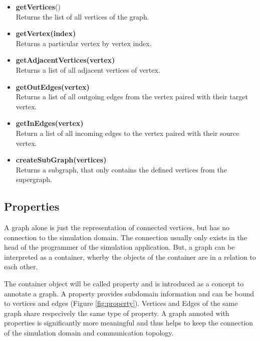 \begin{itemize}
  \item \textbf{getVertices}()\\
    Returns the list of all vertices of the graph.
    
  \item  \textbf{getVertex(index)}\\
    Returns a particular vertex by vertex index.

  \item  \textbf{getAdjacentVertices(vertex)}\\
    Returns a list of all adjacent vertices of vertex.

  \item  \textbf{getOutEdges(vertex)}\\
    Returns a list of all outgoing edges from the vertex
    paired with their target vertex.

  \item  \textbf{getInEdges(vertex)}\\
    Return a list of all incoming edges to the vertex 
    paired with their source vertex.

  \item  \textbf{createSubGraph(vertices)}\\
    Returns a subgraph, that only contains the defined
    vertices from the supergraph.
\end{itemize}

\subsection{Properties}
A graph alone is just the representation of connected vertices, but
has no connection to the simulation domain. The connection usually
only exists in the head of the programmer of the simulation
application. But, a graph can be interpreted as a container, wherby the
objects of the container are in a relation to each other.

The container object will be called property and is introduced as a
concept to annotate a graph. A property provides subdomain information
and can be bound to vertices and edges (Figure
\ref{fig:property}). Vertices and Edges of the same graph share
respecively the same type of property. A graph annoted with properties
is significantly more meaningful and thus helps to keep the connection
of the simulation domain and communication topology.

